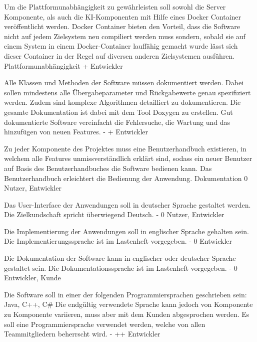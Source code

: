         {Um die Plattformunabhängigkeit zu gewährleisten soll sowohl die Server Komponente, als auch die KI-Komponenten mit Hilfe eines Docker Container veröffentlicht werden.}
        {Docker Container bieten den Vorteil, dass die Software nicht auf jedem Zielsystem neu compiliert werden muss sondern, sobald sie auf einem System in einem Docker-Container lauffähig gemacht wurde lässt sich dieser Container in der Regel auf diversen anderen Zielsystemen ausführen.}
        {Plattformunabhängigkeit}
        {+}
        {Entwickler}

        {Alle Klassen und Methoden der Software müssen dokumentiert werden. Dabei sollen mindestens alle Übergabeparameter und Rückgabewerte genau spezifiziert werden. Zudem sind komplexe Algorithmen detailliert zu dokumentieren. Die gesamte Dokumentation ist dabei mit dem Tool Doxygen zu erstellen.}
        {Gut dokumentierte Software vereinfacht die Fehlersuche, die Wartung und das hinzufügen von neuen Features.}
        {-}
        {+}
        {Entwickler}

        {Zu jeder Komponente des Projektes muss eine Benutzerhandbuch existieren, in welchem alle Features unmissverständlich erklärt sind, sodass ein neuer Benutzer auf Basis des Benutzerhandbuches die Software bedienen kann.}
        {Das Benutzerhandbuch erleichtert die Bedienung der Anwendung.}
        {Dokumentation}
        {0}
        {Nutzer, Entwickler}

        {Das User-Interface der Anwendungen soll in deutscher Sprache gestaltet werden.}
        {Die Zielkundschaft spricht überwiegend Deutsch.}
        {-}
        {0}
        {Nutzer, Entwickler}

        {Die Implementierung der Anwendungen soll in englischer Sprache gehalten sein.}
        {Die Implementierungssprache ist im Lastenheft vorgegeben.}
        {-}
        {0}
        {Entwickler}

        {Die Dokumentation der Software kann in englischer oder deutscher Sprache gestaltet sein.}
        {Die Dokumentationssprache ist im Lastenheft vorgegeben.}
        {-}
        {0}
        {Entwickler, Kunde}

        {Die Software soll in einer der folgenden Programmiersprachen geschrieben sein: Java, C++, C\# Die endgültig verwendete Sprache kann jedoch von Komponente zu Komponente variieren, muss aber mit dem Kunden abgesprochen werden.}
        {Es soll eine Programmiersprache verwendet werden, welche von allen Teammitgliedern beherrscht wird.}
        {-}
        {++}
        {Entwickler}	

